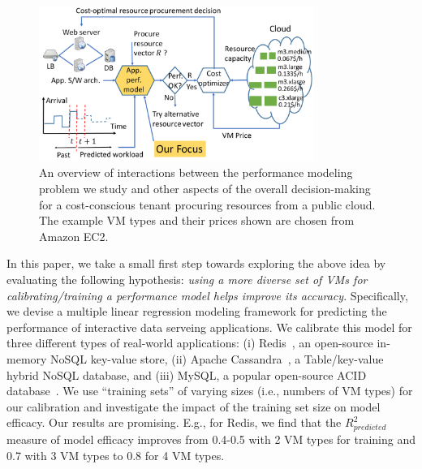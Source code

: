 
\begin{figure}[htbp]
\centering
\includegraphics[width=0.8\textwidth]{system}
\caption{An overview of interactions between the performance modeling problem we study and other aspects of the overall decision-making for a cost-conscious tenant procuring resources from a public cloud. The example VM types and their prices shown are chosen from Amazon EC2. }
\label{fig:diagram}
\end{figure}


 In this paper, we take a small first step towards exploring the above idea by evaluating the following hypothesis: {\em using a more diverse set of VMs for calibrating/training a performance model helps improve its accuracy}. Specifically, we devise a multiple linear regression modeling framework for predicting the performance of interactive data  serveing applications. We calibrate this model for three different types of real-world applications: (i) Redis~\cite{redis}, an open-source in-memory NoSQL key-value store, (ii) Apache Cassandra~\cite{cassandra}, a Table/key-value hybrid NoSQL database, and (iii) MySQL, a popular open-source ACID database~\cite{mysql}. We use ``training sets'' of varying sizes (i.e., numbers of VM types) for our calibration and investigate the impact of the training set size on model efficacy. Our results are promising. E.g., for Redis, we find that the $R^2_{predicted}$ measure of model efficacy improves from 0.4-0.5 with 2 VM types for training and 0.7 with 3 VM types to 0.8 for 4 VM types. 

